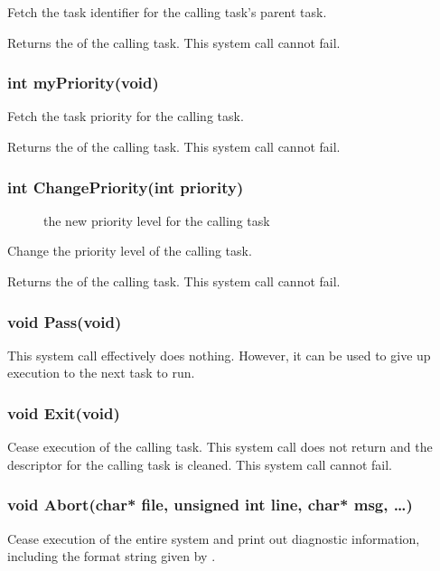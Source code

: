 \documentclass[pdftex,10pt,a4paper]{article}
\begin{document}
Fetch the task identifier for the calling task's parent task.

Returns the  of the calling task. This system call cannot fail.


\subsubsection*{int myPriority(void)}

Fetch the task priority for the calling task.

Returns the  of the calling task. This system call cannot fail.


\subsubsection*{int ChangePriority(int priority)}

\begin{description}
\item[] the new priority level for the calling task
\end{description}

Change the priority level of the calling task.

Returns the  of the calling task. This system call cannot fail.


\subsubsection*{void Pass(void)}

This system call effectively does nothing. However, it can be used to
give up execution to the next task to run.


\subsubsection*{void Exit(void)}

Cease execution of the calling task. This system call does not return
and the descriptor for the calling task is cleaned. This system call
cannot fail.


\subsubsection*{void Abort(char* file, unsigned int line, char* msg, \ldots)}

Cease execution of the entire system and print out diagnostic
information, including the format string given by .
\end{document}
